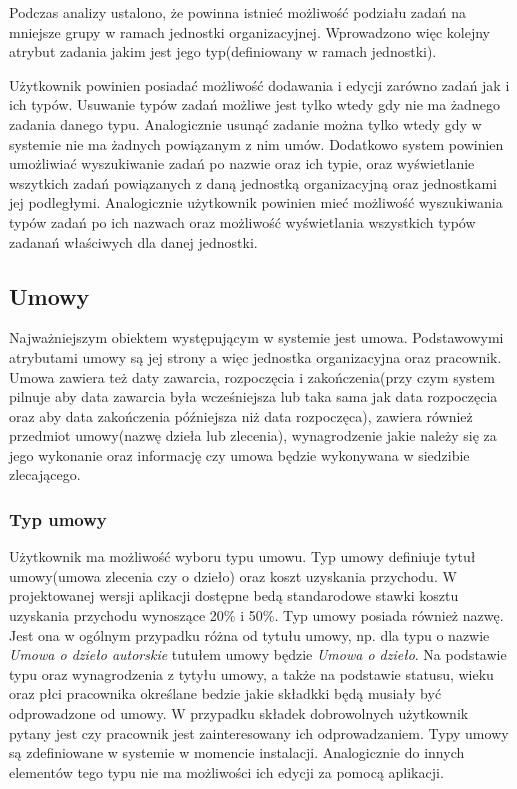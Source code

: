 Podczas analizy ustalono, że powinna istnieć możliwość podziału zadań na mniejsze grupy w ramach jednostki organizacyjnej. Wprowadzono więc kolejny atrybut zadania jakim jest jego typ(definiowany w ramach jednostki). 

Użytkownik powinien posiadać możliwość dodawania i edycji zarówno zadań jak i ich typów. Usuwanie typów zadań możliwe jest tylko wtedy gdy nie ma żadnego zadania danego typu. Analogicznie usunąć zadanie można tylko wtedy gdy w systemie nie ma żadnych powiązanym z nim umów. Dodatkowo system powinien umożliwiać wyszukiwanie zadań po nazwie oraz ich typie, oraz wyświetlanie wszytkich zadań powiązanych z daną jednostką organizacyjną oraz jednostkami jej podległymi. Analogicznie użytkownik powinien mieć możliwość wyszukiwania typów zadań po ich nazwach oraz możliwość wyświetlania wszystkich typów zadanań właściwych dla danej jednostki.

\subsection[Umowy][Umowy]{Umowy}
Najważniejszym obiektem występującym w systemie jest umowa. Podstawowymi atrybutami umowy są jej strony a więc jednostka organizacyjna oraz pracownik. Umowa zawiera też daty zawarcia, rozpoczęcia i zakończenia(przy czym system pilnuje aby data zawarcia była wcześniejsza lub taka sama jak data rozpoczęcia oraz aby data zakończenia późniejsza niż data rozpoczęca), zawiera również przedmiot umowy(nazwę dzieła lub zlecenia), wynagrodzenie jakie należy się za jego wykonanie oraz informację czy umowa będzie wykonywana w siedzibie zlecającego. 

\subsubsection{Typ umowy}
Użytkownik ma możliwość wyboru typu umowu. Typ umowy definiuje tytuł umowy(umowa zlecenia czy o dzieło) oraz koszt uzyskania przychodu. W projektowanej wersji aplikacji dostępne bedą standarodowe stawki kosztu uzyskania przychodu wynoszące 20\% i 50\%. Typ umowy posiada również nazwę. Jest ona w ogólnym przypadku różna od tytułu umowy, np. dla typu o nazwie \textit{Umowa o dzieło autorskie} tutułem umowy będzie \textit{Umowa o dzieło}. Na podstawie typu oraz wynagrodzenia z tytyłu umowy, a także na podstawie statusu, wieku oraz płci pracownika określane bedzie jakie składkki będą musiały być odprowadzone od umowy. W przypadku składek dobrowolnych użytkownik pytany jest czy pracownik jest zainteresowany ich odprowadzaniem. Typy umowy są zdefiniowane w systemie w momencie instalacji. Analogicznie do innych elementów tego typu nie ma możliwości ich edycji za pomocą aplikacji.


